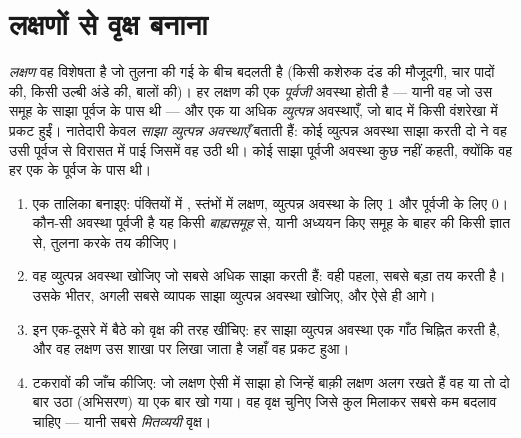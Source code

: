 \section{लक्षणों से वृक्ष बनाना}

\begin{definition}[पूर्वजी और व्युत्पन्न अवस्थाएँ]\label{def:g12:phylogenetic-trees:states}
\emph{लक्षण} वह विशेषता है जो तुलना की गई  के बीच बदलती है (किसी
कशेरुक दंड की मौजूदगी, चार पादों की, किसी उल्बी अंडे की, बालों की)। हर
लक्षण की एक \emph{पूर्वजी} अवस्था होती है --- यानी वह जो उस समूह के साझा
पूर्वज के पास थी --- और एक या अधिक \emph{व्युत्पन्न} अवस्थाएँ, जो बाद में
किसी वंशरेखा में प्रकट हुईं। नातेदारी केवल \emph{साझा व्युत्पन्न
अवस्थाएँ} बताती हैं: कोई व्युत्पन्न अवस्था साझा करती दो  ने वह उसी
पूर्वज से विरासत में पाई जिसमें वह उठी थी। कोई साझा पूर्वजी अवस्था कुछ नहीं
कहती, क्योंकि वह हर एक के पूर्वज के पास थी।
\end{definition}

\begin{method}[किसी लक्षण-आव्यूह से किसी वृक्ष तक]\label{met:g12:phylogenetic-trees:build}
\begin{enumerate}
  \item एक तालिका बनाइए: पंक्तियों में , स्तंभों में लक्षण,
        व्युत्पन्न अवस्था के लिए 1 और पूर्वजी के लिए 0। कौन-सी अवस्था
        पूर्वजी है यह किसी \emph{बाह्यसमूह} से, यानी अध्ययन किए समूह के
        बाहर की किसी ज्ञात  से, तुलना करके तय कीजिए।
  \item वह व्युत्पन्न अवस्था खोजिए जो सबसे अधिक  साझा करती हैं: वही
        पहला, सबसे बड़ा  तय करती है। उसके भीतर, अगली सबसे व्यापक साझा
        व्युत्पन्न अवस्था खोजिए, और ऐसे ही आगे।
  \item इन एक-दूसरे में बैठे  को वृक्ष की तरह खींचिए: हर साझा
        व्युत्पन्न अवस्था एक गाँठ चिह्नित करती है, और वह लक्षण उस शाखा पर
        लिखा जाता है जहाँ वह प्रकट हुआ।
  \item टकरावों की जाँच कीजिए: जो लक्षण ऐसी  में साझा हो जिन्हें
        बाक़ी लक्षण अलग रखते हैं वह या तो दो बार उठा (अभिसरण) या एक बार खो
        गया। वह वृक्ष चुनिए जिसे कुल मिलाकर सबसे कम बदलाव चाहिए --- यानी
        सबसे \emph{मितव्ययी} वृक्ष।
\end{enumerate}
\end{method}

